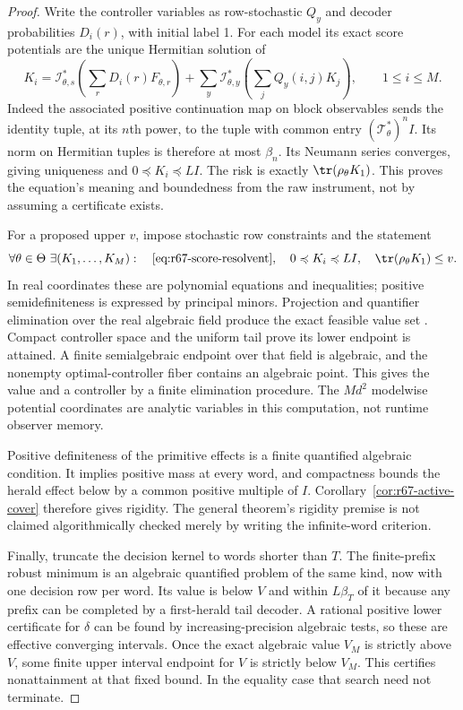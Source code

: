 \begin{proof}
Write the controller variables as row-stochastic $Q_y$ and decoder probabilities $D_i(r)$, with initial label 1. For each model its exact score potentials are the unique Hermitian solution of
\begin{equation}\label{eq:r67-score-resolvent}
 K_i=\mathcal I_{\theta,s}^*\!\left(\sum_rD_i(r)F_{\theta,r}\right)
       +\sum_y\mathcal I_{\theta,y}^*\!\left(\sum_jQ_y(i,j)K_j\right),
       \qquad 1\le i\le M.
\end{equation}
Indeed the associated positive continuation map on block observables sends the identity tuple, at its $n$th power, to the tuple with common entry $(\mathcal T_\theta^*)^nI$. Its norm on Hermitian tuples is therefore at most $\beta_n$. Its Neumann series converges, giving uniqueness and $0\preccurlyeq K_i\preccurlyeq LI$. The risk is exactly $\tr(\rho_\theta K_1)$. This proves the equation's meaning and boundedness from the raw instrument, not by assuming a certificate exists.

For a proposed upper $v$, impose stochastic row constraints and the statement
\[
 \forall\theta\in\Theta\ \exists(K_1,\ldots,K_M):\quad
 \eqref{eq:r67-score-resolvent},\quad
 0\preccurlyeq K_i\preccurlyeq LI,\quad
 \tr(\rho_\theta K_1)\le v.
\]
In real coordinates these are polynomial equations and inequalities; positive semidefiniteness is expressed by principal minors. Projection and quantifier elimination over the real algebraic field produce the exact feasible value set \cite{Seidenberg54}. Compact controller space and the uniform tail prove its lower endpoint is attained. A finite semialgebraic endpoint over that field is algebraic, and the nonempty optimal-controller fiber contains an algebraic point. This gives the value and a controller by a finite elimination procedure. The $Md^2$ modelwise potential coordinates are analytic variables in this computation, not runtime observer memory.

Positive definiteness of the primitive effects is a finite quantified algebraic condition. It implies positive mass at every word, and compactness bounds the herald effect below by a common positive multiple of $I$. Corollary~\ref{cor:r67-active-cover} therefore gives rigidity. The general theorem's rigidity premise is not claimed algorithmically checked merely by writing the infinite-word criterion.

Finally, truncate the decision kernel to words shorter than $T$. The finite-prefix robust minimum is an algebraic quantified problem of the same kind, now with one decision row per word. Its value is below $V$ and within $L\beta_T$ of it because any prefix can be completed by a first-herald tail decoder. A rational positive lower certificate for $\delta$ can be found by increasing-precision algebraic tests, so these are effective converging intervals. Once the exact algebraic value $V_M$ is strictly above $V$, some finite upper interval endpoint for $V$ is strictly below $V_M$. This certifies nonattainment at that fixed bound. In the equality case that search need not terminate.
\end{proof}
